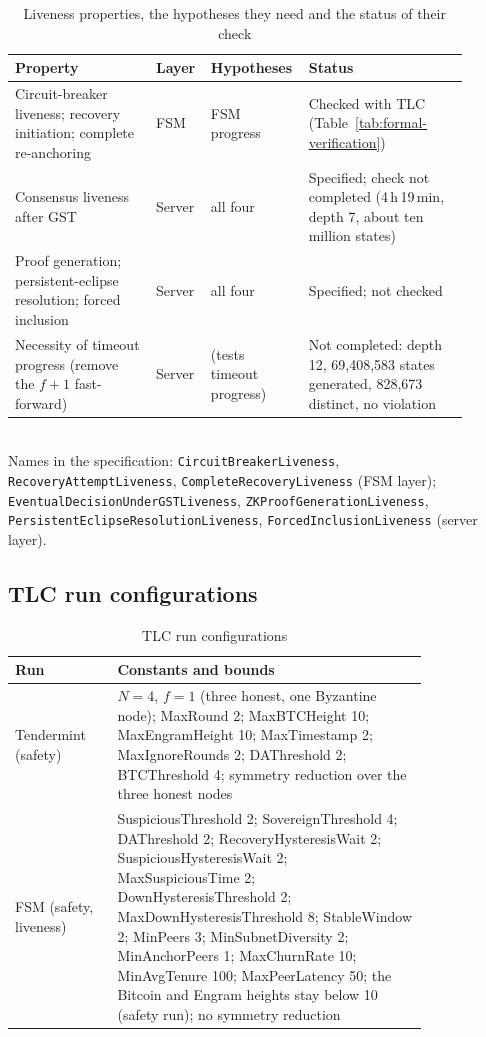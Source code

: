 \begin{table}[H]
\caption{Liveness properties, the hypotheses they need and the status of their check}
\label{tab:liveness}
\centering
\footnotesize
\newcommand{\rcc}[1]{\raggedright\arraybackslash #1}
\begin{tabular}{@{}>{\rcc}p{0.30\linewidth}>{\rcc}p{0.10\linewidth}>{\rcc}p{0.16\linewidth}>{\rcc}p{0.34\linewidth}@{}}
\toprule
\textbf{Property} & \textbf{Layer} & \textbf{Hypotheses} & \textbf{Status} \\
\midrule
Circuit-breaker liveness; recovery initiation; complete re-anchoring & FSM & FSM progress & Checked with TLC (Table~\ref{tab:formal-verification}) \\
Consensus liveness after GST & Server & all four & Specified; check not completed (4\,h\,19\,min, depth 7, about ten million states) \\
Proof generation; persistent-eclipse resolution; forced inclusion & Server & all four & Specified; not checked \\
Necessity of timeout progress (remove the $f{+}1$ fast-forward) & Server & (tests timeout progress) & Not completed: depth 12, 69{,}408{,}583 states generated, 828{,}673 distinct, no violation \\
\bottomrule
\end{tabular}
\\[2pt]
\footnotesize Names in the specification: \texttt{CircuitBreakerLiveness},
\texttt{RecoveryAttemptLiveness}, \texttt{CompleteRecoveryLiveness} (FSM layer);
\texttt{EventualDecisionUnderGSTLiveness}, \texttt{ZKProofGenerationLiveness},
\texttt{PersistentEclipseResolutionLiveness}, \texttt{ForcedInclusionLiveness}
(server layer).
\end{table}

\subsection*{TLC run configurations}

\begin{table}[H]
\caption{TLC run configurations}
\label{tab:formal-config}
\centering
\footnotesize
\begin{tabular}{@{}p{0.2\linewidth}p{0.62\linewidth}@{}}
\toprule
\textbf{Run} & \textbf{Constants and bounds} \\
\midrule
Tendermint (safety) & $N{=}4$, $f{=}1$ (three honest, one Byzantine node); MaxRound 2; MaxBTCHeight 10; MaxEngramHeight 10; MaxTimestamp 2; MaxIgnoreRounds 2; DAThreshold 2; BTCThreshold 4; symmetry reduction over the three honest nodes \\
FSM (safety, liveness) & SuspiciousThreshold 2; SovereignThreshold 4; DAThreshold 2; RecoveryHysteresisWait 2; SuspiciousHysteresisWait 2; MaxSuspiciousTime 2; DownHysteresisThreshold 2; MaxDownHysteresisThreshold 8; StableWindow 2; MinPeers 3; MinSubnetDiversity 2; MinAnchorPeers 1; MaxChurnRate 10; MinAvgTenure 100; MaxPeerLatency 50; the Bitcoin and Engram heights stay below 10 (safety run); no symmetry reduction \\
\bottomrule
\end{tabular}
\end{table}
